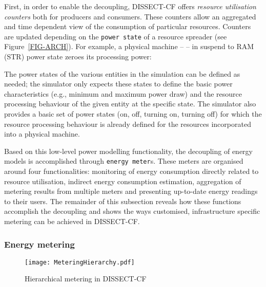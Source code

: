 \documentclass[sort, compress, 5p]{elsarticle}
\begin{document}
First, in order to enable the decoupling, DISSECT-CF offers \emph{resource utilisation counters} both for producers and consumers. These counters allow an aggregated and time dependent view of the consumption of particular resources. Counters are updated depending on the \verb+power state+ of a resource spreader (see Figure~\ref{FIG-ARCH}). For example, a physical machine --  -- in suspend to RAM (STR) power state zeroes its processing power: 

The power states of the various entities in the simulation can be defined as needed; the simulator only expects these states to define the basic power characteristics (e.g., minimum and maximum power draw) and the resource processing behaviour of the given entity at the specific state. The simulator also provides a basic set of power states (on, off, turning on, turning off) for which the resource processing behaviour is already defined for the resources incorporated into a physical machine.

Based on this low-level power modelling functionality, the decoupling of energy models is accomplished through  \verb+energy meter+s. These meters are organised around four functionalities:  monitoring of energy consumption directly related to resource utilisation,  indirect energy consumption estimation,  aggregation of metering results from multiple meters and  presenting up-to-date energy readings to their users. The remainder of this subsection reveals how these functions accomplish the decoupling and shows the ways customised, infrastructure specific metering can be achieved in DISSECT-CF.

\subsubsection{Energy metering} \label{SEC-ENMET}
\begin{figure}[tb]
\centering
\texttt{[image: MeteringHierarchy.pdf]}
\caption{Hierarchical metering in DISSECT-CF\label{FIG-METERS}}
\end{figure}
\end{document}
